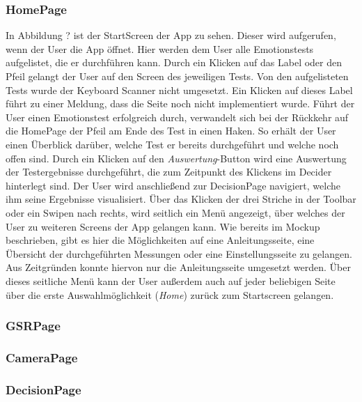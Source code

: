 \subsubsection{HomePage}
In Abbildung ? ist der StartScreen der App zu sehen. Dieser wird aufgerufen, wenn der User die App öffnet. Hier werden dem User alle Emotionstests aufgelistet, die er durchführen kann. Durch ein Klicken auf das Label oder den Pfeil gelangt der User auf den Screen des jeweiligen Tests. Von den aufgelisteten Tests wurde der Keyboard Scanner nicht umgesetzt. Ein Klicken auf dieses Label führt zu einer Meldung, dass die Seite noch nicht implementiert wurde. \newline
Führt der User einen Emotionstest erfolgreich durch, verwandelt sich bei der Rückkehr auf die HomePage der Pfeil am Ende des Test in einen Haken. So erhält der User einen Überblick darüber, welche Test er bereits durchgeführt und welche noch offen sind. \newline
Durch ein Klicken auf den \textit{Auswertung}-Button wird eine Auswertung der Testergebnisse durchgeführt, die zum Zeitpunkt des Klickens im Decider hinterlegt sind. Der User wird anschließend zur DecisionPage navigiert, welche ihm seine Ergebnisse visualisiert. \newline
Über das Klicken der drei Striche in der Toolbar oder ein Swipen nach rechts, wird seitlich ein Menü angezeigt, über welches der User zu weiteren Screens der App gelangen kann. Wie bereits im Mockup beschrieben, gibt es hier die Möglichkeiten auf eine Anleitungsseite, eine Übersicht der durchgeführten Messungen oder eine Einstellungsseite zu gelangen. Aus Zeitgründen konnte hiervon nur die Anleitungsseite umgesetzt werden. Über dieses seitliche Menü kann der User außerdem auch auf jeder beliebigen Seite über die erste Auswahlmöglichkeit (\textit{Home}) zurück zum Startscreen gelangen.
\subsubsection{GSRPage}
\subsubsection{CameraPage}
\subsubsection{DecisionPage}
